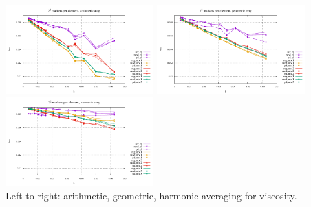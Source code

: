 \begin{center}
\includegraphics[width=5.7cm]{python_codes/fieldstone_13/RESULTS/vrms_am} 
\includegraphics[width=5.7cm]{python_codes/fieldstone_13/RESULTS/vrms_gm} 
\includegraphics[width=5.7cm]{python_codes/fieldstone_13/RESULTS/vrms_hm}\\
{\captionfont Left to right: arithmetic, geometric, harmonic averaging for viscosity.}
\end{center}


